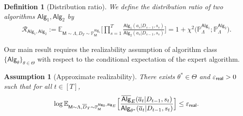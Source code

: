 \documentclass[10pt]{article}
\newtheorem{definition}[theorem]{Definition}
\newtheorem{assumption}{Assumption}
\renewcommand{\epsilon}{\varepsilon}
\newcommand{\<}{\left\langle}
\renewcommand{\>}{\right\rangle}
\newcommand{\E}{\mathbb{E}}
\renewcommand{\P}{\mathbb{P}}
\newcommand{\inst}{{\mathsf{M}}}
\newcommand{\widebar}[1]{\overline{#1}}
\newcommand{\state}{{s}}
\newcommand{\action}{{a}}
\newcommand{\eaction}{{\widebar{a}}}%
\newcommand{\reward}{{r}}
\newcommand{\totlen}{{T}} %
\newcommand{\sAlg}{{\mathsf{Alg}}}
\newcommand{\osAlg}{\overline{\mathsf{Alg}}}
\newcommand{\dset}{{D}}
\newcommand{\adset}{{\widebar{D}}}  %
\newcommand{\Par}{{\theta}}
\newcommand{\Parspace}{{\Theta}}
\newcommand{\TruePar}{{\theta^*}}
\newcommand{\prior}{{\Lambda}}
\newcommand{\shortexp}{{E}}
\newcommand{\geneps}{{\epsilon}_{\sf real}}
\newcommand{\totreward}{{\mathfrak{R}}}  %
\newcommand{\distratio}{{\mathcal{R}}}
\newcommand{\authnote}[2]{{\scriptsize $\ll$\textsf{#1 notes: #2}$\gg$}}
\newcommand{\authnote}[2]{}
\newcommand{\yub}[1]{{\color{red}\authnote{Yu}{#1}}}
\newcommand{\lc}[1]{{\color{blue}\authnote{Licong}{#1}}}
\begin{document}
\begin{definition}[Distribution ratio]\label{def:dist_ratio}
\label{def:distribution-ratio}
We define the distribution ratio of two algorithms $\sAlg_1,\sAlg_2$ by
\begin{align*}\distratio_{\sAlg_1,\sAlg_2}
:=
\E_{\inst\sim\prior,\dset_\totlen\sim\P_\inst^{\sAlg_1}}
\Big[\prod_{s=1}^{\totlen}\frac{\sAlg_1(\action_s|\dset_{s-1},\state_s)}{\sAlg_2(\action_s|\dset_{s-1},\state_s)}\Big] = 1 + \chi^2\Big( \P_\prior^{\sAlg_1};\P_\prior^{\sAlg_2} \Big).
\end{align*}
\end{definition}


Our main result requires the realizability assumption of algorithm class $\{ \sAlg_\Par\}_{\Par \in \Parspace}$ with respect to the conditional expectation of the expert algorithm. 

\begin{assumption}[Approximate realizability]
\label{asp:realizability}
There exists $\TruePar\in\Parspace$ and $\geneps > 0$ such that for all $t\in[\totlen]$, 
\begin{align}
\label{eqn:plc_approx_general}
\log\E_{\inst \sim \prior, \adset_\totlen \sim \P_{\inst}^{\sAlg_0,\sAlg_\shortexp}}\Big[\frac{\osAlg_{\shortexp}(\eaction_t|\dset_{t-1},\state_t )}{\sAlg_\TruePar(\eaction_t|\dset_{t-1},\state_t )}\Big] \le \geneps. 
\end{align}
\end{assumption}

\end{document}
